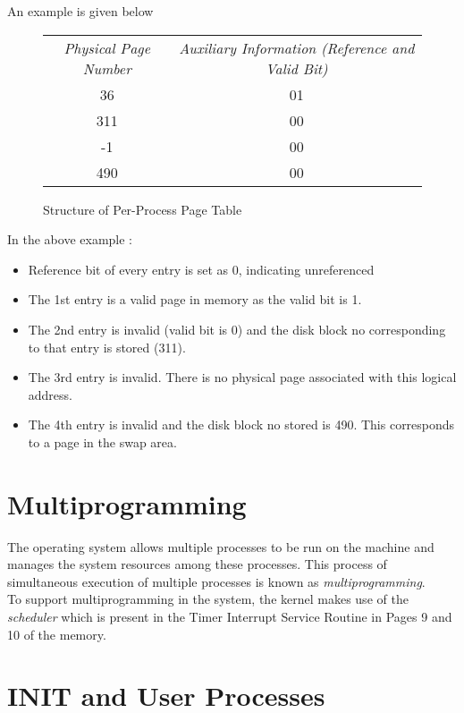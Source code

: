 \documentclass[10pt]{report}
\begin{document}
An example is given below
		\begin{figure}[htp!]
		\centering
		\begin{tabular}{|c|c|}
			\textit{Physical Page Number} & \textit{Auxiliary Information (Reference and Valid Bit)} \\
			\cline{0-1}
			36 & 01  \\
			\cline{0-1}
			311 & 00 \\
			\cline{0-1}
			-1 &  00 \\
			\cline{0-1}
			490 & 00 \\
			\cline{0-1}
		\end{tabular}
		\caption{Structure of Per-Process Page Table}
		\label{fig:processfile table}
	\end{figure}
	
	In the above example :
\begin{itemize}
	\item Reference bit of every entry is set as 0, indicating unreferenced
	\item The 1st entry is a valid page in memory as the valid bit is 1.
	\item The 2nd entry is invalid (valid bit is 0) and the disk block no corresponding to that entry is stored (311).
	\item The 3rd entry is invalid. There is no physical page associated with this logical address.
	\item The 4th entry is invalid and the disk block no stored is 490. This corresponds to a page in the swap area.
\end{itemize}		
	  
	
	
\section{Multiprogramming}
\label{sec:multiprogramming}
	
The operating system allows multiple processes to be run on the machine and manages the system resources among these processes. This process of simultaneous execution of multiple processes is known as \emph{multiprogramming}.  \\

To support multiprogramming in the system, the kernel makes use of the \emph{scheduler} which is present in the Timer Interrupt Service Routine in Pages 9 and 10 of the memory.

\section{INIT and User Processes}
\label{sec:init and userprogs}
\end{document}
